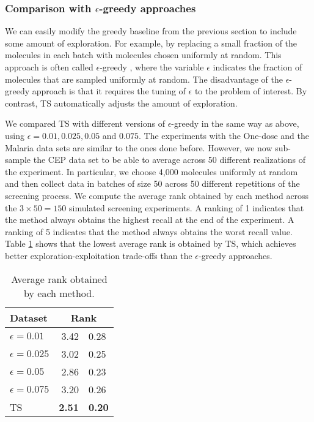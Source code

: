 \subsubsection{Comparison with $\epsilon$-greedy approaches}

We can easily modify the greedy baseline from the previous section to include some amount of exploration. For example, by replacing a small fraction of the molecules in each batch with molecules chosen uniformly at random. This approach is often called $\epsilon$-greedy \cite{watkins1989learning}, where the variable $\epsilon$ indicates the fraction of molecules that are sampled uniformly at random. The disadvantage of the $\epsilon$-greedy approach is that it requires the tuning of $\epsilon$ to the problem of interest. By contrast, TS automatically adjusts the amount of exploration. 

We compared TS with different versions of $\epsilon$-greedy in the same way as above, using $\epsilon = 0.01, 0.025, 0.05$ and $0.075$. The experiments with the One-dose and the Malaria data sets are similar to the ones done before. However, we now sub-sample the CEP data set to be able to average across 50 different realizations of the experiment. In particular, we choose 4,000 molecules uniformly at random and then collect data in batches of size 50 across 50 different repetitions of the screening process. We compute the average rank obtained by each method across the $3\times 50 = 150$ simulated screening experiments. A ranking of 1 indicates that the method always obtains the highest recall at the end of the experiment. A ranking of 5 indicates that the method always obtains the worst recall value. Table \ref{tab:results_epsilon_greedy} shows that the lowest average rank is obtained by TS, which achieves better exploration-exploitation trade-offs than the $\epsilon$-greedy approaches.

\begin{table}
\label{tab:results_epsilon_greedy}
\caption{Average rank obtained by each method.}
\begin{tabular}{lr@{$\pm$}l}
\hline
\bf{Dataset}& \multicolumn{2}{c}{\bf{Rank}}\\
\hline
$\epsilon = 0.01$ & 3.42 & 0.28 \\
$\epsilon = 0.025$ & 3.02 & 0.25 \\
$\epsilon = 0.05$ & 2.86 & 0.23 \\
$\epsilon = 0.075$ & 3.20 & 0.26 \\
TS & \bf{ 2.51 }&\bf{ 0.20 } \\
\hline
\end{tabular}
\end{table}